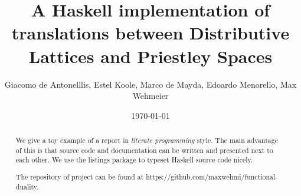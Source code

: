 \documentclass[12pt,a4paper]{article}
\title{A Haskell implementation of translations between Distributive Lattices and Priestley Spaces}
\author{Giacomo de Antonelllis, Estel Koole, Marco de Mayda, Edoardo Menorello, Max Wehmeier}
\date{\today}
\begin{document}
\maketitle

\begin{abstract}
We give a toy example of a report in \emph{literate programming} style.
The main advantage of this is that source code and documentation can
be written and presented next to each other.
We use the listings package to typeset Haskell source code nicely.

The repository of project can be found at https://github.com/maxwehmi/functional-duality.
\end{abstract}

\vfill

\tableofcontents

\clearpage


















\end{document}
